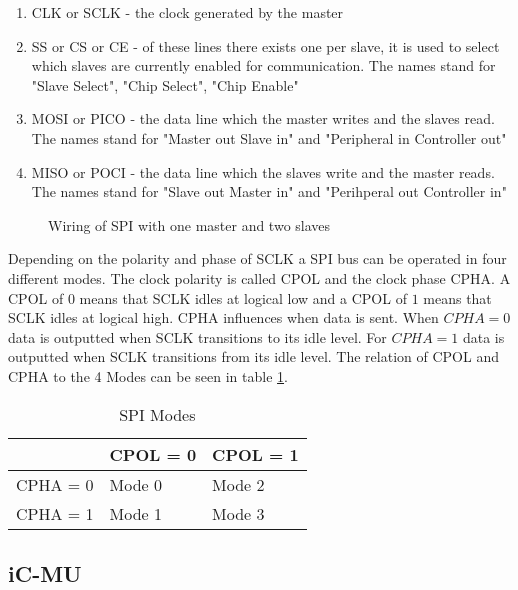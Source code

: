 \begin{enumerate}
    \item CLK or SCLK - the clock generated by the master
    \item SS or CS or CE - of these lines there exists one per slave, it is used to select which slaves are currently enabled for communication. The names stand for "Slave Select", "Chip Select", "Chip Enable"
    \item MOSI or PICO - the data line which the master writes and the slaves read. The names stand for "Master out Slave in" and "Peripheral in Controller out"
    \item MISO or POCI - the data line which the slaves write and the master reads. The names stand for "Slave out Master in" and "Perihperal out Controller in"
\end{enumerate}

\begin{figure}[hp]
    \begin{center}
        
        \caption{Wiring of SPI with one master and two slaves}
        \label{fig:spi}
    \end{center}
\end{figure}

Depending on the polarity and phase of SCLK a SPI bus can be operated in four different modes.
The clock polarity is called CPOL and the clock phase CPHA.
A CPOL of $0$ means that SCLK idles at logical low and a CPOL of $1$ means that SCLK idles at logical high.
CPHA influences when data is sent.
When $CPHA = 0$ data is outputted when SCLK transitions to its idle level.
For $CPHA = 1$ data is outputted when SCLK transitions from its idle level.
The relation of CPOL and CPHA to the 4 Modes can be seen in table \ref{tab:spi_modes}.

\begin{table}[hp]
    \begin{tabular}{|l|l|l|}
        \hline
                    & CPOL = 0  & CPOL = 1     \\ \hline
        CPHA = 0    & Mode 0    & Mode 2    \\ \hline
        CPHA = 1    & Mode 1    & Mode 3    \\ \hline
    \end{tabular}
    \caption{SPI Modes}
    \label{tab:spi_modes}
\end{table}

\subsection{iC-MU}
\label{sec:background:hardware:ic-mu}
